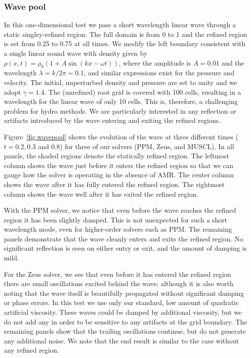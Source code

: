 \subsubsection{Wave pool}
\label{sec.tests.wavepool}

In this one-dimensional test we pass a short wavelength linear wave through a static singley-refined region.  The full domain is from 0 to 1 and the refined region is set from 0.25 to 0.75 at all times.  We modify the left boundary consistent with a single linear sound wave with density given by $\rho(x,t) = \rho_0 (1 + A \sin(kx - \omega t))$, where the amplitude is $A = 0.01$ and the wavelength $\lambda = k/2\pi = 0.1$, and similar expressions exist for the pressure and velocity.  The initial, unperturbed density and pressure are set to unity and we adopt $\gamma = 1.4$.  The (unrefined) root grid is covered with 100 cells, resulting in a wavelength for the linear wave of only 10 cells.  This is, therefore, a challenging problem for hydro methods.  We are particularly interested in any reflection or artifacts introduced by the wave entering and exiting the refined regions.

Figure~\ref{fig.wavepool} shows the evolution of the wave at three different times ($t = 0.2, 0.3$ and 0.8) for three of our solvers (PPM, Zeus, and MUSCL).  In all panels, the shaded regions denote the statically refined region. The leftmost column shows the wave just before it enters the refined region so that we can gauge how the solver is operating in the absence of AMR.  The center column shows the wave after it has fully entered the refined region.  The rightmost column shows the wave well after it has exited the refined region.

With the PPM solver, we notice that even before the wave reaches the refined region it has been slightly damped. This is not unexpected for such a short wavelength mode, even for higher-order solvers such as PPM.  The remaining panels demonstrate that the wave cleanly enters and exits the refined region.  No significant reflection is seen on either entry or exit, and the amount of damping is mild.

For the Zeus solver, we see that even before it has entered the refined region there are small oscillations excited behind the wave; although it is also worth noting that the wave itself is beautifully propagated without significant damping or phase errors.  In this test we use only our standard, low amount of quadratic artificial viscosity.  These waves could be damped by additional viscosity, but we do not add any in order to be sensitive to any artifacts at the grid boundary.  The remaining panels show that the trailing oscillations continue, but do not generate any additional noise. We note that the end result is similar to the case without any refined region.

